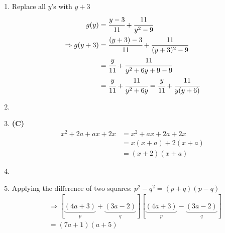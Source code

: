 \begin{multicols}{2}
\begin{enumerate}[label={\textbf{\arabic*.}}]
    \item Replace all \(y\)'s with \(y + 3\)
    \begin{align*} 
        g(y) &= \cfrac{y - 3}{11} + \cfrac{11}{y^2 - 9} \\
       \Rightarrow  g(y + 3) &= \cfrac{(y + 3) - 3}{11} + \cfrac{11}{(y + 3)^2 - 9}  \\
        & = \cfrac{y}{11} + \cfrac{11}{y^2 + 6y + 9 -9} \\
        & = \cfrac{y}{11} + \cfrac{11}{y^2 + 6y} = \cfrac{y}{11} + \cfrac{11}{y (y + 6 ) }
    \end{align*}
    \item 
    \item \textbf{(C)}
        \begin{align*} 
            x^2 + 2a + ax + 2x &= x^2 + ax + 2a + 2x \\
            &= x(x + a) + 2(x + a) \\
            &= (x + 2)(x + a)
        \end{align*}
    \item 
    \item Applying the difference of two squares: \(p^2 - q^2 = (p + q)(p - q)\)
        \begin{align*}
            &\Rightarrow [\underbrace{(4a + 3)}_{p} + \underbrace{(3a - 2)}_{q}][\underbrace{(4a + 3)}_{p} - \underbrace{(3a - 2)}_{q}] \\
            &= (7a + 1)(a + 5)
        \end{align*}
    

\end{enumerate}
\end{multicols}
